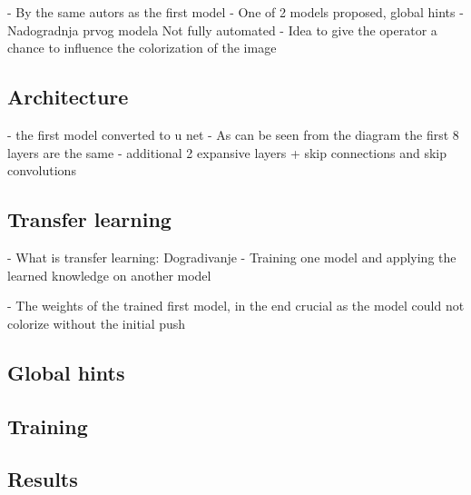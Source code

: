 - By the same autors as the first model
- One of 2 models proposed, global hints
- Nadogradnja prvog modela
Not fully automated
- Idea to give the operator a chance to influence the colorization of the image

\subsection{Architecture}
- the first model converted to u net
- As can be seen from the diagram the first 8 layers are the same
- additional 2 expansive layers + skip connections and skip convolutions

\subsection{Transfer learning}

- What is transfer learning:
	Dogradivanje
	- Training one model and applying the learned knowledge on another model
	
- The weights of the trained first model, in the end crucial as the model could not colorize without the initial push

\subsection{Global hints}



\subsection{Training}

\subsection{Results}